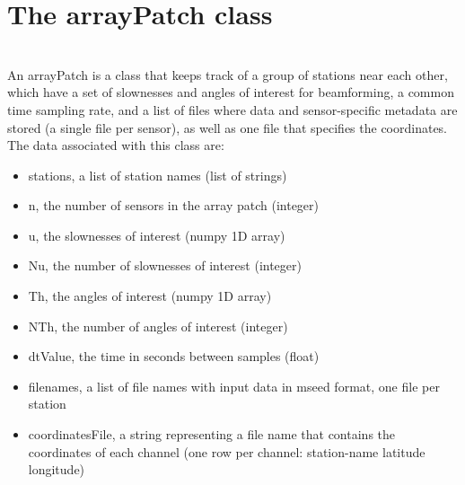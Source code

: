 \documentclass{article}
\begin{document}
\section{The arrayPatch class}
\\
An arrayPatch is a class that keeps track of a group of stations near each other, which have a set of slownesses and angles of interest for beamforming, a common time sampling rate, and a list of files where data and sensor-specific metadata are stored (a single file per sensor), as well as one file that specifies the coordinates. The data associated with this class are:
\begin{itemize}
    \item stations, a list of station names (list of strings)
	\item n, the number of sensors in the array patch (integer)
	\item u, the slownesses of interest (numpy 1D array)
	\item Nu, the number of slownesses of interest (integer)
	\item Th, the angles of interest (numpy 1D array)
	\item NTh, the number of angles of interest (integer)
	\item dtValue, the time in seconds between samples (float)
	\item filenames, a list of file names with input data in mseed format, one file per station
	\item coordinatesFile, a string representing a file name that contains the coordinates of each channel (one row per channel: station-name latitude  longitude)
\end{itemize}
\\
\\
\end{document}
